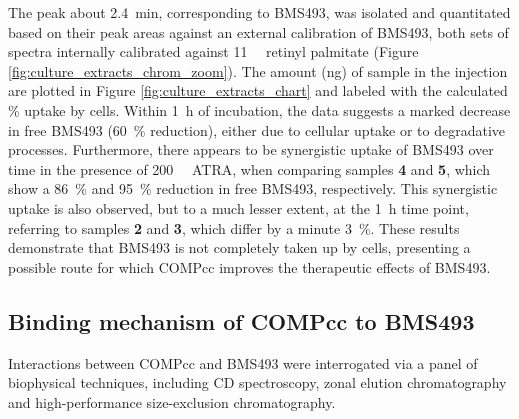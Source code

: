 \begin{refsection}
The peak about \SI{2.4}{\minute}, corresponding to BMS493, was isolated and
quantitated based on their peak areas against an external calibration of BMS493,
both sets of spectra internally calibrated against \SI{11}{\micro\moLar} retinyl
palmitate (Figure \ref{fig:culture_extracts_chrom_zoom}). The amount (\si{\ng})
of sample in the injection are plotted in Figure
\ref{fig:culture_extracts_chart} and labeled with the calculated \% uptake by
cells. Within \SI{1}{\hour} of incubation, the data suggests a marked decrease
in free BMS493 (\SI{60}{\percent} reduction), either due to cellular uptake or to degradative processes.
Furthermore, there appears to be synergistic uptake of BMS493 over time in the
presence of \SI{200}{\nano\moLar} ATRA, when comparing samples \textbf{4} and
\textbf{5}, which show a \SI{86}{\percent} and \SI{95}{\percent} reduction in
free BMS493, respectively. This synergistic uptake is also observed, but to a much lesser
extent, at the \SI{1}{\hour} time point, referring to samples \textbf{2} and
\textbf{3}, which differ by a minute \SI{3}{\percent}. These results demonstrate
that BMS493 is not completely taken up by cells, presenting a possible route for
which COMPcc improves the therapeutic effects of BMS493.

\subsection{Binding mechanism of COMPcc to BMS493}
\label{sec:binding_mechanism}
Interactions between COMPcc and BMS493 were interrogated via a panel of
biophysical techniques, including CD spectroscopy, zonal elution chromatography
and high-performance size-exclusion chromatography.


\end{refsection}
